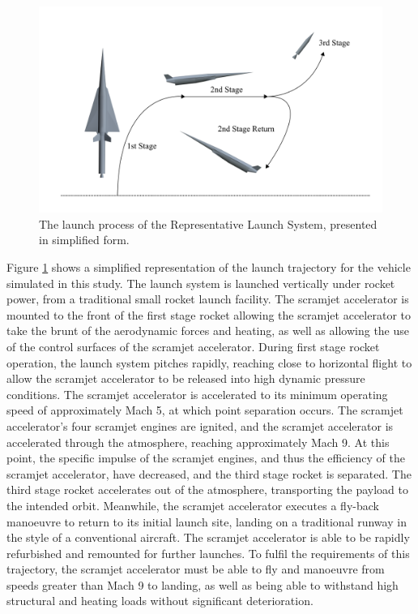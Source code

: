 \begin{figure}[ht]
	\centering
	\includegraphics[width=0.9\linewidth]{figures/3_vehicle_design/Trajsimple}
	\caption{The launch process of the Representative Launch System, presented in simplified form.}
	\label{fig:Trajsimple}
\end{figure}
 Figure \ref{fig:Trajsimple} shows a simplified representation of the launch trajectory for the vehicle simulated in this study.
 The launch system is launched vertically under rocket power, from a traditional small rocket launch facility. The scramjet accelerator is mounted to the front of the first stage rocket allowing the scramjet accelerator to take the brunt of the aerodynamic forces and heating, as well as allowing the use of the control surfaces of the scramjet accelerator. During first stage rocket operation, the launch system pitches rapidly, reaching close to horizontal flight to allow the scramjet accelerator to be released into high dynamic pressure conditions. The scramjet accelerator is accelerated to its minimum operating speed of approximately Mach 5, at which point separation occurs. The scramjet accelerator's four scramjet engines are ignited, and the scramjet accelerator is accelerated through the atmosphere, reaching approximately Mach 9. At this point, the specific impulse of the scramjet engines, and thus the efficiency of the scramjet accelerator, have decreased, and the third stage rocket is separated. The third stage rocket accelerates out of the atmosphere, transporting the payload to the intended orbit. Meanwhile, the scramjet accelerator executes a fly-back manoeuvre to return to its initial launch site, landing on a traditional runway in the style of a conventional aircraft. The scramjet accelerator is able to be rapidly refurbished and remounted for further launches. To fulfil the requirements of this trajectory, the scramjet accelerator must be able to fly and manoeuvre from speeds greater than Mach 9 to landing, as well as being able to withstand high structural and heating loads without significant deterioration.
 

